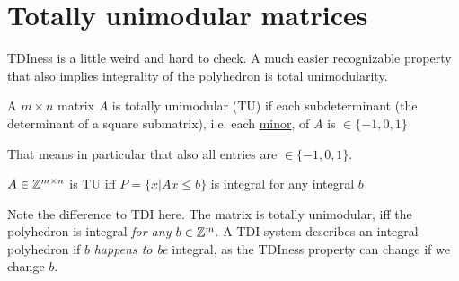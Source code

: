 \section{Totally unimodular matrices}

TDIness is a little weird and hard to check. A much easier recognizable property that also implies integrality of the polyhedron is total unimodularity.

\begin{Def} A $m\times n$ matrix $A$ is totally unimodular (TU) if each subdeterminant (the determinant of a square submatrix), i.e. each \href{http://en.wikipedia.org/wiki/Minor\_\%28linear\_algebra\%29}{minor}, of $A$ is $\in \{-1,0,1\}$
\end{Def}

That means in particular that also all entries are $\in \{-1,0,1\}$.

\begin{thm} $A\in \mathbb{Z}^{m\times n}$ is TU iff $P=\{x|Ax\leq b\}$ is integral for any integral $b$
\end{thm}

Note the difference to TDI here. The matrix is totally unimodular, iff the polyhedron is integral \emph{for any} $b\in \mathbb{Z}^m$. A TDI system describes an integral polyhedron if $b$ \emph{happens to be} integral, as the TDIness property can change if we change $b$.

